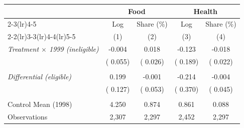\begin{tabular}{lcccc} \hline \hline
& \multicolumn{2}{c}{Food} & \multicolumn{2}{c}{Health} \\ 
\cmidrule(lr){2-3}\cmidrule(lr){4-5}
& \multicolumn{1}{c}{Log} & \multicolumn{1}{c}{Share (\%)} & \multicolumn{1}{c}{Log} & \multicolumn{1}{c}{Share (\%)} \\ 
\cmidrule(lr){2-2}\cmidrule(lr){3-3}\cmidrule(lr){4-4}\cmidrule(lr){5-5}
& \multicolumn{1}{c}{(1)} & \multicolumn{1}{c}{(2)} & \multicolumn{1}{c}{(3)} & \multicolumn{1}{c}{(4)} \\ \toprule
\textit{Treatment $\times$ 1999 (ineligible)} & -0.004 & 0.018 & -0.123 & -0.018 \\ 
 & (    0.055) & (    0.026) & (    0.189) & (    0.022) \\ 
  & & & & \\ 
\textit{Differential (eligible)} & 0.199 & -0.001 & -0.214 & -0.004 \\ 
 & (    0.127) & (    0.053) & (    0.370) & (    0.045) \\ 
  & & & & \\ 
Control Mean (1998) &     4.250 &     0.874 &     0.861 &     0.088 \\ 
Observations &        2,307 &        2,297 &        2,452 &        2,297 \\ \bottomrule
\end{tabular}